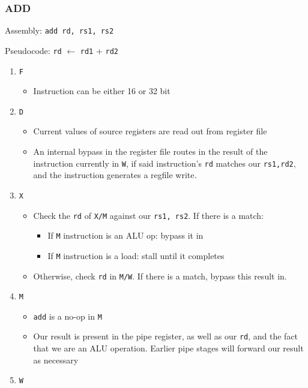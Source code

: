 \documentclass{article}
\begin{document}
\subsubsection{ADD}

Assembly: \texttt{add rd, rs1, rs2}

Pseudocode: \texttt{rd} $\leftarrow$ \texttt{rd1} $+$ \texttt{rd2}

\begin{enumerate}
	\item \texttt{F}
	\begin{itemize}
		\item Instruction can be either 16 or 32 bit
	\end{itemize}
	\item \texttt{D}
	\begin{itemize}
		\item Current values of source registers are read out from register file
		\item An internal bypass in the register file routes in the result of the instruction currently in \texttt{W}, if said instruction's \texttt{rd} matches our \texttt{rs1,rd2}, and the instruction generates a regfile write.
	\end{itemize}
	\item \texttt{X}
	\begin{itemize}
		\item Check the \texttt{rd} of \texttt{X/M} against our \texttt{rs1, rs2}. If there is a match:
		\begin{itemize}
			\item If \texttt{M} instruction is an ALU op: bypass it in
			\item If \texttt{M} instruction is a load: stall until it completes
		\end{itemize}
		\item Otherwise, check \texttt{rd} in \texttt{M/W}. If there is a match, bypass this result in.
	\end{itemize}
	\item \texttt{M}
	\begin{itemize}
		\item \texttt{add} is a no-op in \texttt{M}
		\item Our result is present in the pipe register, as well as our \texttt{rd}, and the fact that we are an ALU operation. Earlier pipe stages will forward our result as necessary
	\end{itemize}
	\item \texttt{W}
	\begin{itemize}

\end{itemize}
\end{enumerate}
\end{document}
